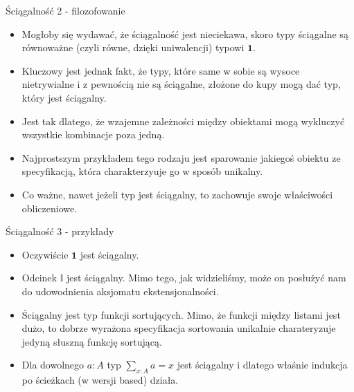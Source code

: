 \documentclass{beamer}
\newcommand{\I}{\mathbb{I}}
\begin{document}
\begin{frame}{Ściągalność 2 - filozofowanie}
\begin{itemize}
	\item Mogłoby się wydawać, że ściągalność jest nieciekawa, skoro typy ściągalne są równoważne (czyli równe, dzięki uniwalencji) typowi $\textbf{1}$.
	\item Kluczowy jest jednak fakt, że typy, które same w sobie są wysoce nietrywialne i z pewnością nie są ściągalne, złożone do kupy mogą dać typ, który jest ściągalny.
	\item Jest tak dlatego, że wzajemne zależności między obiektami mogą wykluczyć wszystkie kombinacje poza jedną.
	\item Najprostszym przykładem tego rodzaju jest sparowanie jakiegoś obiektu ze specyfikacją, która charakterzyuje go w sposób unikalny.
	\item Co ważne, nawet jeżeli typ jest ściągalny, to zachowuje swoje właściwości obliczeniowe.
\end{itemize}
\end{frame}

\begin{frame}{Ściągalność 3 - przykłady}
\begin{itemize}
	\item Oczywiście $\textbf{1}$ jest ściągalny.
	\item Odcinek $\I$ jest ściągalny. Mimo tego, jak widzieliśmy, może on posłużyć nam do udowodnienia aksjomatu ekstensjonalności.
	\item Ściągalny jest typ funkcji sortujących. Mimo, że funkcji między listami jest dużo, to dobrze wyrażona specyfikacja sortowania unikalnie charateryzuje jedyną słuszną funkcję sortującą.
	\item Dla dowolnego $a : A$ typ $\sum_{x : A} a = x$ jest ściągalny i dlatego właśnie indukcja po ścieżkach (w wersji based) działa.
\end{itemize}
\end{frame}
\end{document}
